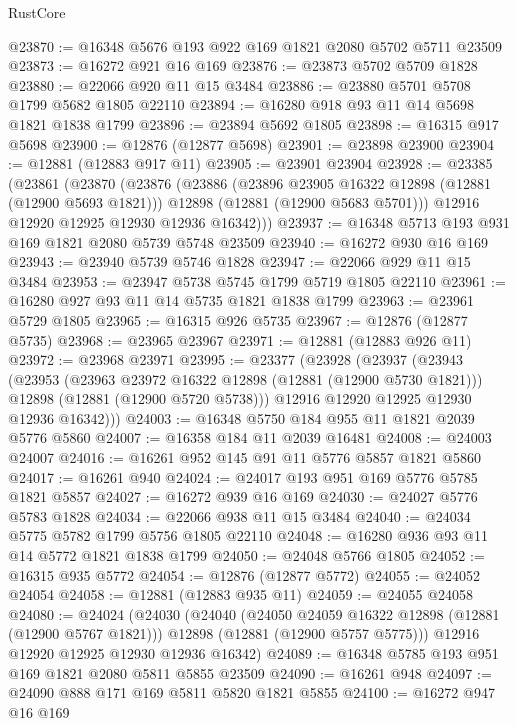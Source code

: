 \begin{lexlean}{RustCore}
\begin{coremodule}
@23870 := @16348 @5676 @193 @922 @169 @1821 @2080 @5702 @5711 @23509
@23873 := @16272 @921 @16 @169
@23876 := @23873 @5702 @5709 @1828
@23880 := @22066 @920 @11 @15 @3484
@23886 := @23880 @5701 @5708 @1799 @5682 @1805 @22110
@23894 := @16280 @918 @93 @11 @14 @5698 @1821 @1838 @1799
@23896 := @23894 @5692 @1805
@23898 := @16315 @917 @5698
@23900 := @12876 (@12877 @5698)
@23901 := @23898 @23900
@23904 := @12881 (@12883 @917 @11)
@23905 := @23901 @23904
@23928 := @23385
    (@23861
      (@23870
        (@23876
          (@23886
            (@23896 @23905 @16322 @12898 (@12881 (@12900 @5693 @1821)))
            @12898
            (@12881 (@12900 @5683 @5701)))
          @12916
          @12920
          @12925
          @12930
          @12936
          @16342)))
@23937 := @16348 @5713 @193 @931 @169 @1821 @2080 @5739 @5748 @23509
@23940 := @16272 @930 @16 @169
@23943 := @23940 @5739 @5746 @1828
@23947 := @22066 @929 @11 @15 @3484
@23953 := @23947 @5738 @5745 @1799 @5719 @1805 @22110
@23961 := @16280 @927 @93 @11 @14 @5735 @1821 @1838 @1799
@23963 := @23961 @5729 @1805
@23965 := @16315 @926 @5735
@23967 := @12876 (@12877 @5735)
@23968 := @23965 @23967
@23971 := @12881 (@12883 @926 @11)
@23972 := @23968 @23971
@23995 := @23377
    (@23928
      (@23937
        (@23943
          (@23953
            (@23963 @23972 @16322 @12898 (@12881 (@12900 @5730 @1821)))
            @12898
            (@12881 (@12900 @5720 @5738)))
          @12916
          @12920
          @12925
          @12930
          @12936
          @16342)))
@24003 := @16348 @5750 @184 @955 @11 @1821 @2039 @5776 @5860
@24007 := @16358 @184 @11 @2039 @16481
@24008 := @24003 @24007
@24016 := @16261 @952 @145 @91 @11 @5776 @5857 @1821 @5860
@24017 := @16261 @940
@24024 := @24017 @193 @951 @169 @5776 @5785 @1821 @5857
@24027 := @16272 @939 @16 @169
@24030 := @24027 @5776 @5783 @1828
@24034 := @22066 @938 @11 @15 @3484
@24040 := @24034 @5775 @5782 @1799 @5756 @1805 @22110
@24048 := @16280 @936 @93 @11 @14 @5772 @1821 @1838 @1799
@24050 := @24048 @5766 @1805
@24052 := @16315 @935 @5772
@24054 := @12876 (@12877 @5772)
@24055 := @24052 @24054
@24058 := @12881 (@12883 @935 @11)
@24059 := @24055 @24058
@24080 := @24024
    (@24030
      (@24040
        (@24050 @24059 @16322 @12898 (@12881 (@12900 @5767 @1821)))
        @12898
        (@12881 (@12900 @5757 @5775)))
      @12916
      @12920
      @12925
      @12930
      @12936
      @16342)
@24089 := @16348 @5785 @193 @951 @169 @1821 @2080 @5811 @5855 @23509
@24090 := @16261 @948
@24097 := @24090 @888 @171 @169 @5811 @5820 @1821 @5855
@24100 := @16272 @947 @16 @169

\end{coremodule}
\end{lexlean}

